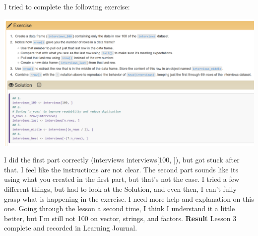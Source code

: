 \documentclass{article}
\begin{document}
I tried to complete the following exercise:

\includegraphics[width=1.0\textwidth]{rstudio_21.PNG}

I did the first part correctly (interviews \<\- interviews[100, ]), but got stuck after that. I feel like the instructions are not clear. The second part sounds like its using what you created in the first part, but that's not the case. I tried a few different things, but had to look at the Solution, and even then, I can't fully grasp what is happening in the exercise. I need more help and explanation on this one. Going through the lesson a second time, I think I understand it a little better, but I'm still not 100 on vector, strings, and factors.
\textbf{Result} Lesson 3 complete and recorded in Learning Journal.





\end{document}
